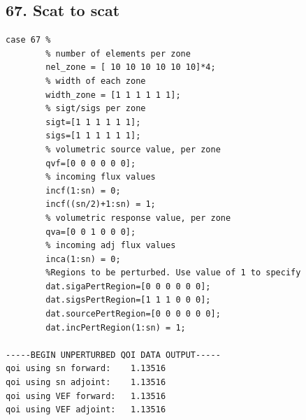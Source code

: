 \documentclass{article}
\begin{document}
\subsection{67. Scat to scat}
\begin{verbatim}
case 67 %
        % number of elements per zone
        nel_zone = [ 10 10 10 10 10 10]*4;
        % width of each zone
        width_zone = [1 1 1 1 1 1];
        % sigt/sigs per zone
        sigt=[1 1 1 1 1 1];
        sigs=[1 1 1 1 1 1];
        % volumetric source value, per zone
        qvf=[0 0 0 0 0 0];
        % incoming flux values
        incf(1:sn) = 0;
        incf((sn/2)+1:sn) = 1;
        % volumetric response value, per zone
        qva=[0 0 1 0 0 0];
        % incoming adj flux values
        inca(1:sn) = 0;
        %Regions to be perturbed. Use value of 1 to specify
        dat.sigaPertRegion=[0 0 0 0 0 0];
        dat.sigsPertRegion=[1 1 1 0 0 0];
        dat.sourcePertRegion=[0 0 0 0 0 0];
        dat.incPertRegion(1:sn) = 1; 
        
-----BEGIN UNPERTURBED QOI DATA OUTPUT----- 
qoi using sn forward: 	 1.13516 
qoi using sn adjoint: 	 1.13516 
qoi using VEF forward: 	 1.13516 
qoi using VEF adjoint: 	 1.13516 
\end{verbatim}
\end{document}
